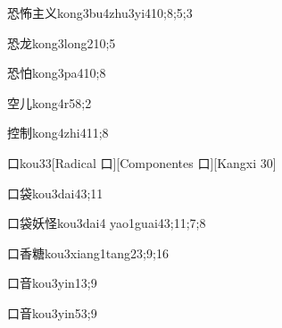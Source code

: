 \begin{verbete}{恐怖主义}{kong3bu4zhu3yi4}{10;8;5;3}
\end{verbete}

\begin{verbete}{恐龙}{kong3long2}{10;5}
\end{verbete}

\begin{verbete}{恐怕}{kong3pa4}{10;8}
\end{verbete}

\begin{verbete}{空儿}{kong4r5}{8;2}
\end{verbete}

\begin{verbete}{控制}{kong4zhi4}{11;8}
\end{verbete}

\begin{verbete}{口}{kou3}{3}[Radical 口][Componentes 口][Kangxi 30]
\end{verbete}

\begin{verbete}{口袋}{kou3dai4}{3;11}
\end{verbete}

\begin{verbete}{口袋妖怪}{kou3dai4 yao1guai4}{3;11;7;8}
\end{verbete}

\begin{verbete}{口香糖}{kou3xiang1tang2}{3;9;16}
\end{verbete}

\begin{verbete}{口音}{kou3yin1}{3;9}
\end{verbete}

\begin{verbete}{口音}{kou3yin5}{3;9}
\end{verbete}

